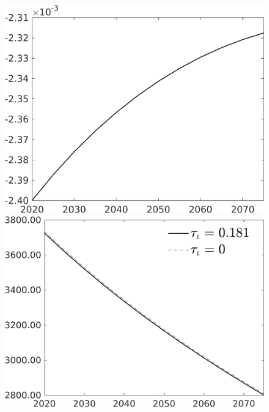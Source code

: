 \begin{figure}[h!!]
\begin{minipage}[]{0.32\textwidth}
\end{minipage}
\begin{minipage}[]{0.32\textwidth}
\includegraphics[width=1\textwidth]{../../codding_model/own_basedOnFried/optimalPol_010922_revision/figures/all_13Sept22/CompTaufPER_bytaul_Reg0_sn_spillover0_nsk0_xgr0_knspil0_sep0_LFlimit0_emsbase0_countec0_GovRev0_etaa0.79_lgd0.png}
\end{minipage}
\begin{minipage}[]{0.32\textwidth}
\includegraphics[width=1\textwidth]{../../codding_model/own_basedOnFried/optimalPol_010922_revision/figures/all_13Sept22/CompTauf_bytaul_Reg0_sgsff_spillover0_nsk0_xgr0_knspil0_sep0_LFlimit0_emsbase0_countec0_GovRev0_etaa0.79_lgd1.png}

\end{minipage}
\end{figure}
